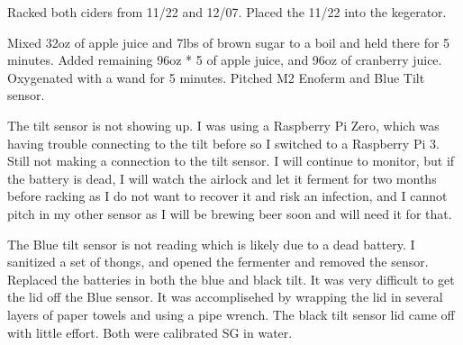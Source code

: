 \def\todaysdate{20210108}
\newday{\todaysdate}\label{\todaysdate}


\begin{my_itemize}
    \item Racked both ciders from 11/22 and 12/07.  Placed the 11/22 into the kegerator.
\end{my_itemize}

\def\todaysdate{20210530}
\newday{\todaysdate}\label{\todaysdate}


\begin{my_itemize}
    \item Mixed 32oz of apple juice and 7lbs of brown sugar to a boil and held there for 5 minutes.  Added remaining 96oz * 5 of apple juice, and 96oz of cranberry juice.  Oxygenated with a wand for 5 minutes.  Pitched M2 Enoferm and Blue Tilt sensor.
    \item The tilt sensor is not showing up.  I was using a Raspberry Pi Zero, which was having trouble connecting to the tilt before so I switched to a Raspberry Pi 3.  Still not making a connection to the tilt sensor.  I will continue to monitor, but if the battery is dead, I will watch the airlock and let it ferment for two months before racking as I do not want to recover it and risk an infection, and I cannot pitch in my other sensor as I will be brewing beer soon and will need it for that.
\end{my_itemize}

\def\todaysdate{20210603}
\newday{\todaysdate}\label{\todaysdate}


The Blue tilt sensor is not reading which is likely due to a dead battery.  I sanitized a set of thongs, and opened the fermenter and removed the sensor.  Replaced the batteries in both the blue and black tilt.  It was very difficult to get the lid off the Blue sensor.  It was accomplisehed by wrapping the lid in several layers of paper towels and using a pipe wrench.  The black tilt sensor lid came off with little effort.  Both were calibrated SG in water.  
